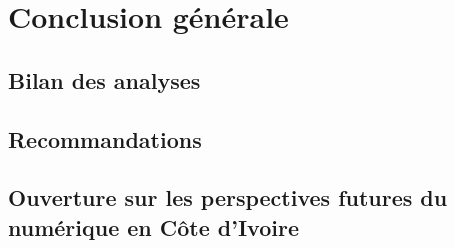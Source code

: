 
\chapter{Conclusion générale}

\section{Bilan des analyses}


\section{Recommandations}


\section{Ouverture sur les perspectives futures du numérique en Côte d'Ivoire}



%
%





